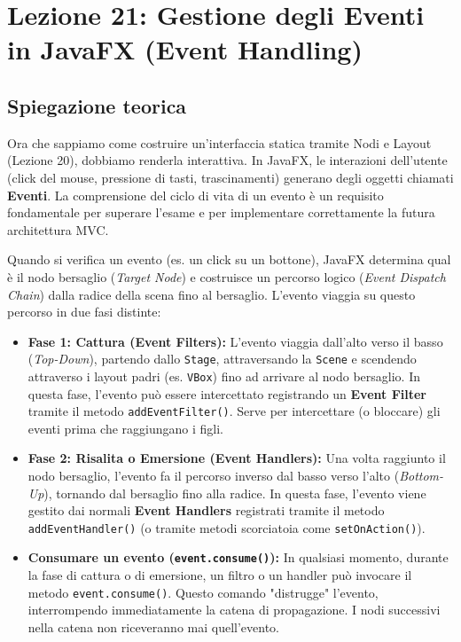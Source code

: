 \documentclass[12pt, a4paper]{article}
\begin{document}
\newpage

\section{Lezione 21: Gestione degli Eventi in JavaFX (Event Handling)}

\subsection{Spiegazione teorica}
Ora che sappiamo come costruire un'interfaccia statica tramite Nodi e Layout (Lezione 20), dobbiamo renderla interattiva. In JavaFX, le interazioni dell'utente (click del mouse, pressione di tasti, trascinamenti) generano degli oggetti chiamati \textbf{Eventi}. La comprensione del ciclo di vita di un evento è un requisito fondamentale per superare l'esame e per implementare correttamente la futura architettura MVC.

Quando si verifica un evento (es. un click su un bottone), JavaFX determina qual è il nodo bersaglio (\textit{Target Node}) e costruisce un percorso logico (\textit{Event Dispatch Chain}) dalla radice della scena fino al bersaglio. L'evento viaggia su questo percorso in due fasi distinte:

\begin{itemize}
    \item \textbf{Fase 1: Cattura (Event Filters):} L'evento viaggia dall'alto verso il basso (\textit{Top-Down}), partendo dallo \texttt{Stage}, attraversando la \texttt{Scene} e scendendo attraverso i layout padri (es. \texttt{VBox}) fino ad arrivare al nodo bersaglio. In questa fase, l'evento può essere intercettato registrando un \textbf{Event Filter} tramite il metodo \texttt{addEventFilter()}. Serve per intercettare (o bloccare) gli eventi prima che raggiungano i figli.
    
    \item \textbf{Fase 2: Risalita o Emersione (Event Handlers):} Una volta raggiunto il nodo bersaglio, l'evento fa il percorso inverso dal basso verso l'alto (\textit{Bottom-Up}), tornando dal bersaglio fino alla radice. In questa fase, l'evento viene gestito dai normali \textbf{Event Handlers} registrati tramite il metodo \texttt{addEventHandler()} (o tramite metodi scorciatoia come \texttt{setOnAction()}).
    
    \item \textbf{Consumare un evento (\texttt{event.consume()}):} In qualsiasi momento, durante la fase di cattura o di emersione, un filtro o un handler può invocare il metodo \texttt{event.consume()}. Questo comando "distrugge" l'evento, interrompendo immediatamente la catena di propagazione. I nodi successivi nella catena non riceveranno mai quell'evento.
\end{itemize}
\end{document}
